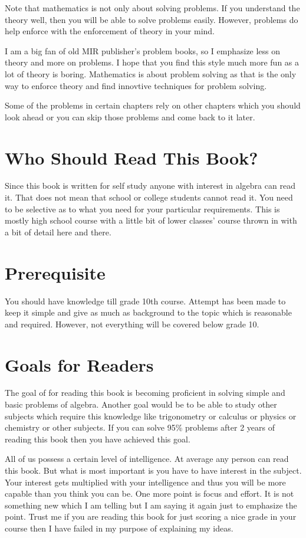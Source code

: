 Note that mathematics is not only about solving problems. If you understand the theory well, then you will be able to solve
problems easily. However, problems do help enforce with the enforcement of theory in your mind.

I am a big fan of old MIR publisher's problem books, so I emphasize less on theory and more on problems. I hope that you find
this style much more fun as a lot of theory is boring. Mathematics is about problem solving as that is the only way to
enforce theory and find innovtive techniques for problem solving.

Some of the problems in certain chapters rely on other chapters which you should look ahead or you can skip those problems and come
back to it later.

\section*{Who Should Read This Book?}
Since this book is written for self study anyone with interest in algebra can read it. That does not mean that school or college
students cannot read it. You need to be selective as to what you need for your particular requirements. This is mostly high school
course with a little bit of lower classes' course thrown in with a bit of detail here and there.

\section*{Prerequisite}
You should have knowledge till grade 10th course. Attempt has been made to keep it simple and give as much as background to the
topic which is reasonable and required. However, not everything will be covered below grade 10.

\section*{Goals for Readers}
The goal of for reading this book is becoming proficient in solving simple and basic problems of algebra. Another goal would be to
be able to study other subjects which require this knowledge like trigonometry or calculus or physics or chemistry or other
subjects. If you can solve 95\% problems after 2 years of reading this book then you have achieved this goal.

All of us possess a certain level of intelligence. At average any person can read this book. But what is most important is you have
to have interest in the subject. Your interest gets multiplied with your intelligence and thus you will be more capable than you
think you can be. One more point is focus and effort. It is not something new which I am telling but I am saying it again just to
emphasize the point. Trust me if you are reading this book for just scoring a nice grade in your course then I have failed in my
purpose of explaining my ideas.

